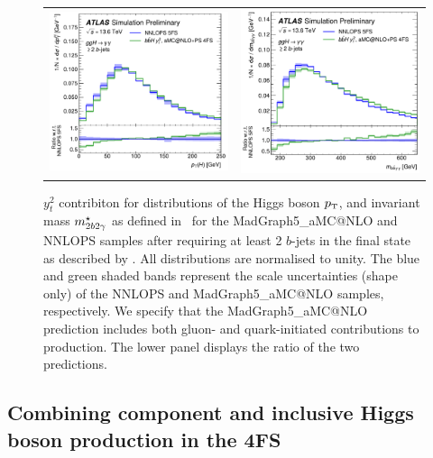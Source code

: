 \documentclass[11pt,a4paper]{article}
\begin{document}
\begin{figure}[t!]
\begin{center}
\begin{tabular}{cc}
\includegraphics[width=.45\textwidth, page=1]{plots/ATLAS/BJetCuts_Higgs1_Pt_shape_comparison_ratio.pdf}&
\includegraphics[width=.44\textwidth, page=1]{plots/ATLAS/BJetCuts_yybb_Mass_shape_comparison_ratio.pdf}
\end{tabular}
\vspace*{1ex}
\caption{$y_t^2$ contribiton for distributions of the Higgs boson $\pt$, and invariant mass $m_{2b2\gamma}^{\star}$ as defined in~  for the {\sc MadGraph5\_aMC@NLO} and {\sc NNLOPS} samples after requiring at least 2 $b$-jets in the final state as described by . All distributions are normalised to unity. The blue and green shaded bands represent the scale uncertainties (shape only) of the {\sc NNLOPS} and {\sc MadGraph5\_aMC@NLO} samples, respectively. We specify that the  {\sc MadGraph5\_aMC@NLO} prediction includes both gluon- and quark-initiated contributions to \bbH{} production. The lower panel displays the ratio of the two predictions.~\cite{atlaspub}\label{fig:4fsNNLOPS}}
\end{center}
\end{figure}

\subsection[Combining $y_t^2$ \bbH{} component and inclusive Higgs boson production in the 4FS]{Combining  \bbH{} component and inclusive Higgs boson production in the 4FS}
\end{document}

